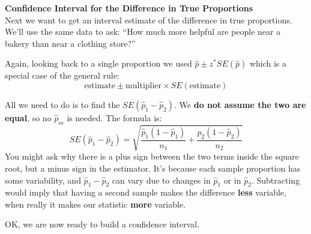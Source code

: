 {\large\bf Confidence Interval for the Difference in True Proportions}
\\
Next we want to get an interval estimate of the difference in true
proportions.  We'll use the same data to ask: ``How much more helpful
are people near a bakery than near a clothing store?''

Again, looking back to a single proportion we used $\widehat{p} \pm
z^*SE(\widehat{p})$ which is a special case of the general rule:
$$ \mbox{estimate} \pm \mbox{multiplier} \times SE(\mbox{estimate})$$

All we need to do is to find the $SE(\widehat{p}_1 - \widehat{p}_2)$.
We {\bf do not assume the two are equal}, so no $\widehat{p}_m$ is
needed. The formula is:
  $$ SE(\widehat{p}_1 - \widehat{p}_2) = \sqrt{ 
      \frac{\widehat{p}_1(1 - \widehat{p}_1)}{n_1} + 
      \frac{\widehat{p}_2(1 - \widehat{p}_2)}{n_2}} $$
You might ask why there is a plus sign between the two terms inside
the square root, but a minus sign in the estimator.  It's because each
sample  proportion has some variability, and $\widehat{p}_1 - \widehat{p}_2 $ 
can vary due to changes in $\widehat{p}_1$ or in $\widehat{p}_2$.  Subtracting
would imply that having a second sample  makes the difference {\bf
  less} variable, when really it makes our statistic {\bf more}
variable. 

OK, we are now ready to build a confidence interval.

